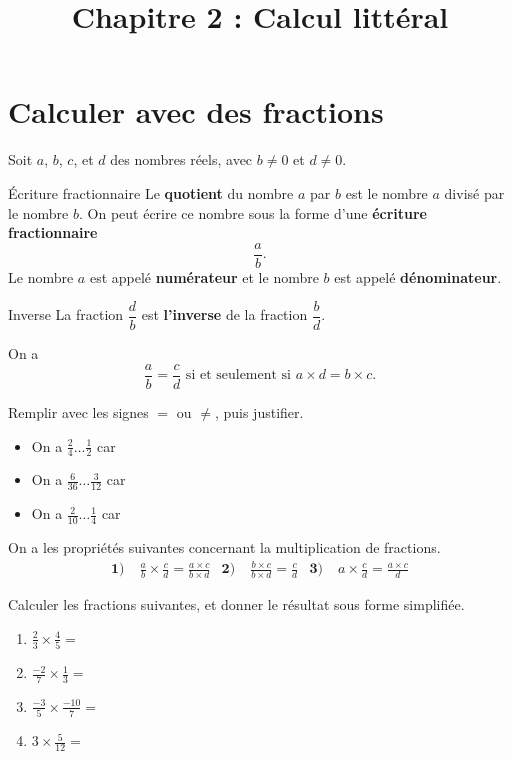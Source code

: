 \documentclass[11pt]{article}
\title{Chapitre 2 : Calcul littéral}
\date{}
\author{}
\begin{document}
\maketitle\thispagestyle{fancy}

\section{Calculer avec des fractions}
\noindent Soit $a$, $b$, $c$, et $d$ des nombres réels, avec $b\neq0$ et $d\neq0$.
\begin{defi}{Écriture fractionnaire}
  Le \textbf{quotient} du nombre $a$ par $b$ est le nombre $a$ divisé par le
  nombre $b$. On peut écrire ce nombre sous la forme d'une \textbf{écriture
  fractionnaire}
  \[
    \frac{a}{b}.
  \]
  Le nombre $a$ est appelé \textbf{numérateur} et le nombre $b$ est appelé
  \textbf{dénominateur}.
\end{defi}
\begin{defi}{Inverse}
  La fraction $\dfrac{d}{b}$ est \textbf{l'inverse} de la fraction
  $\dfrac{b}{d}$.
\end{defi}
\begin{prop}
  On a 
  \[
    \frac{a}{b} = \frac{c}{d}\text{ si et seulement si } a\times d = b\times c.
  \]
\end{prop}
\begin{app}
  Remplir avec les signes $=$ ou $\neq$, puis justifier.
  \begin{itemize}
    \item On a $\frac{2}{4}\dots\frac{1}{2}$ car
    \item On a $\frac{6}{36}\dots\frac{3}{12}$ car
    \item On a $\frac{2}{10}\dots\frac{1}{4}$ car
  \end{itemize}
\end{app}

\begin{prop}
  On a les propriétés suivantes concernant la multiplication de fractions.
  \begin{align*}
    \textbf{1)}\;& \frac{a}{b}\times\frac{c}{d} = \frac{a\times c}{b\times d} &
    \textbf{2)}\;& \frac{b\times c}{b\times d}= \frac{c}{d} &
    \textbf{3)}\;& a\times\frac{c}{d}=\frac{a\times c}{d}
  \end{align*}
\end{prop}
\begin{app}
  Calculer les fractions suivantes, et donner le résultat sous forme simplifiée.
  \begin{multicols}{2}
  \begin{enumerate}
    \item $\frac{2}{3}\times\frac{4}{5} = $
    \item $\frac{-2}{7}\times\frac{1}{3} = $
    \item $\frac{-3}{5}\times\frac{-10}{7} = $
    \item $3\times\frac{5}{12} = $
  \end{enumerate}
\end{multicols}
\end{app}
\end{document}
